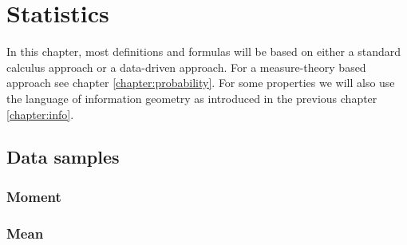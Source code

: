 \chapter{Statistics}

    In this chapter, most definitions and formulas will be based on either a standard calculus approach or a data-driven approach. For a measure-theory based approach see chapter \ref{chapter:probability}. For some properties we will also use the language of information geometry as introduced in the previous chapter \ref{chapter:info}.

\section{Data samples}
\subsection{Moment}


\subsection{Mean}

